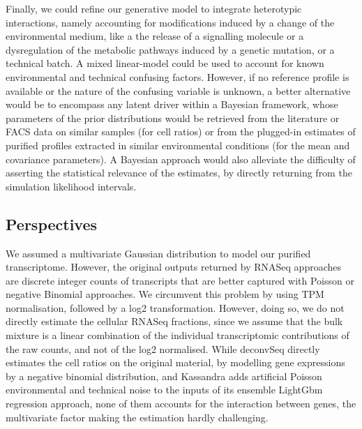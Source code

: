 \documentclass[long, final]{jobim}
\begin{document}
Finally, we could refine our generative model to integrate heterotypic interactions, namely accounting for modifications induced by a change of the environmental medium, like a the release of a signalling molecule or a dysregulation of the metabolic pathways induced by a genetic mutation, or a technical batch. A mixed linear-model could be used to account for known environmental and technical confusing factors. However, if no reference profile is available or the nature of the confusing variable is unknown, a better alternative would be to encompass any latent driver within a Bayesian framework, whose parameters of the prior distributions would be retrieved from the literature or FACS data on similar samples (for cell ratios) or from the plugged-in estimates of purified profiles extracted in similar environmental conditions (for the mean and covariance parameters). A Bayesian approach would also alleviate the difficulty of asserting the statistical relevance of the estimates, by directly returning from the simulation likelihood intervals.




\subsection{Perspectives}
\label{subsec:perspectives}

We assumed a multivariate Gaussian distribution to model our purified transcriptome. However, the original outputs returned by RNASeq approaches are discrete integer counts of transcripts that are better captured with Poisson or negative Binomial approaches. We circumvent this problem by using TPM normalisation, followed by a log2 transformation. However, doing so, we do not directly estimate the cellular RNASeq fractions, since we assume that the bulk mixture is a linear combination of the individual transcriptomic contributions of the raw counts, and not of the log2 normalised. While deconvSeq \cite{du_etal19} directly estimates the cell ratios on the original material, by modelling gene expressions by a negative binomial distribution, and Kassandra \cite{zaitsev_etal22} adds artificial Poisson environmental and technical noise to the inputs of its ensemble LightGbm regression approach, none of them accounts for the interaction between genes, the multivariate factor making the estimation hardly challenging.
\end{document}
